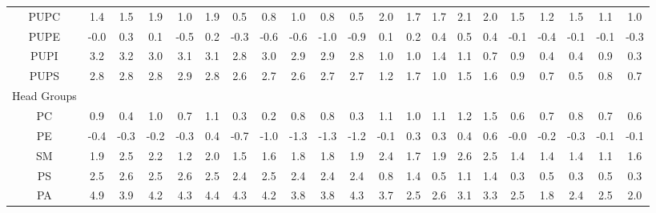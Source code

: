 \documentclass[preprint,3p,9pt,times,onecolumn]{elsarticle}
\begin{document}
\begin{table}
{\begin{tabular}{| c || cccccccccccccccccccc |}
PUPC    & 1.4        & 1.5        & 1.9        & 1.0        & 1.9        & 0.5        & 0.8        & 1.0        & 0.8        & 0.5        & 2.0        & 1.7        & 1.7        & 2.1        & 2.0        & 1.5        & 1.2        & 1.5        & 1.1        & 1.0        \\
PUPE    & -0.0       & 0.3        & 0.1        & -0.5       & 0.2        & -0.3       & -0.6       & -0.6       & -1.0       & -0.9       & 0.1        & 0.2        & 0.4        & 0.5        & 0.4        & -0.1       & -0.4       & -0.1       & -0.1       & -0.3       \\
PUPI    & 3.2        & 3.2        & 3.0        & 3.1        & 3.1        & 2.8        & 3.0        & 2.9        & 2.9        & 2.8        & 1.0        & 1.0        & 1.4        & 1.1        & 0.7        & 0.9        & 0.4        & 0.4        & 0.9        & 0.3        \\
PUPS    & 2.8        & 2.8        & 2.8        & 2.9        & 2.8        & 2.6        & 2.7        & 2.6        & 2.7        & 2.7        & 1.2        & 1.7        & 1.0        & 1.5        & 1.6        & 0.9        & 0.7        & 0.5        & 0.8        & 0.7        \\
\hline
\hline
Head Groups &&&&&&&&&&&&&&&&&&&&\\\hline
PC      & 0.9        & 0.4        & 1.0        & 0.7        & 1.1        & 0.3        & 0.2        & 0.8        & 0.8        & 0.3        & 1.1        & 1.0        & 1.1        & 1.2        & 1.5        & 0.6        & 0.7        & 0.8        & 0.7        & 0.6        \\
PE      & -0.4       & -0.3       & -0.2       & -0.3       & 0.4        & -0.7       & -1.0       & -1.3       & -1.3       & -1.2       & -0.1       & 0.3        & 0.3        & 0.4        & 0.6        & -0.0       & -0.2       & -0.3       & -0.1       & -0.1       \\
SM      & 1.9        & 2.5        & 2.2        & 1.2        & 2.0        & 1.5        & 1.6        & 1.8        & 1.8        & 1.9        & 2.4        & 1.7        & 1.9        & 2.6        & 2.5        & 1.4        & 1.4        & 1.4        & 1.1        & 1.6        \\
PS      & 2.5        & 2.6        & 2.5        & 2.6        & 2.5        & 2.4        & 2.5        & 2.4        & 2.4        & 2.4        & 0.8        & 1.4        & 0.5        & 1.1        & 1.4        & 0.3        & 0.5        & 0.3        & 0.5        & 0.3        \\
PA      & 4.9        & 3.9        & 4.2        & 4.3        & 4.4        & 4.3        & 4.2        & 3.8        & 3.8        & 4.3        & 3.7        & 2.5        & 2.6        & 3.1        & 3.3        & 2.5        & 1.8        & 2.4        & 2.5        & 2.0        \\

\end{tabular}}
\end{table}
\end{document}

